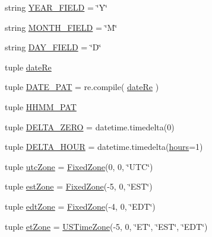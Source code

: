 \begin{DoxyCompactItemize}
string \hyperlink{namespaceamonpy_1_1sim_1_1sidereal__m_ae92c9b6866dbee32a46400d7f0572abb}{Y\-E\-A\-R\-\_\-\-F\-I\-E\-L\-D} = \char`\"{}Y\char`\"{}
\item 
string \hyperlink{namespaceamonpy_1_1sim_1_1sidereal__m_a873ef54e9b5478d5f40ca25fc4fc07be}{M\-O\-N\-T\-H\-\_\-\-F\-I\-E\-L\-D} = \char`\"{}M\char`\"{}
\item 
string \hyperlink{namespaceamonpy_1_1sim_1_1sidereal__m_a1d6c7b1ca1d962bdcc42fc6a03595717}{D\-A\-Y\-\_\-\-F\-I\-E\-L\-D} = \char`\"{}D\char`\"{}
\item 
tuple \hyperlink{namespaceamonpy_1_1sim_1_1sidereal__m_aed7de3b820e3551a51ebe17dd7770baa}{date\-Re}
\item 
tuple \hyperlink{namespaceamonpy_1_1sim_1_1sidereal__m_a1c0ec014abae8082035b7a0335ca4e5d}{D\-A\-T\-E\-\_\-\-P\-A\-T} = re.\-compile( \hyperlink{namespaceamonpy_1_1sim_1_1sidereal__m_aed7de3b820e3551a51ebe17dd7770baa}{date\-Re} )
\item 
tuple \hyperlink{namespaceamonpy_1_1sim_1_1sidereal__m_a0f6ab1a75753c104eefed365e14aad4a}{H\-H\-M\-M\-\_\-\-P\-A\-T}
\item 
tuple \hyperlink{namespaceamonpy_1_1sim_1_1sidereal__m_af468502357aec95173ae54130971484b}{D\-E\-L\-T\-A\-\_\-\-Z\-E\-R\-O} = datetime.\-timedelta(0)
\item 
tuple \hyperlink{namespaceamonpy_1_1sim_1_1sidereal__m_ae6efe7e6fac4c0f8c11b6fbf33a1bad9}{D\-E\-L\-T\-A\-\_\-\-H\-O\-U\-R} = datetime.\-timedelta(\hyperlink{namespaceamonpy_1_1sim_1_1sidereal__m_ab57a43b87f961c10d7510aba50c02942}{hours}=1)
\item 
tuple \hyperlink{namespaceamonpy_1_1sim_1_1sidereal__m_adc5dc1cfd4981bd421a8a994c76c65d4}{utc\-Zone} = \hyperlink{classamonpy_1_1sim_1_1sidereal__m_1_1_fixed_zone}{Fixed\-Zone}(0, 0, \char`\"{}U\-T\-C\char`\"{})
\item 
tuple \hyperlink{namespaceamonpy_1_1sim_1_1sidereal__m_ad4ecd1f85cd34046df5d51b69693c7d3}{est\-Zone} = \hyperlink{classamonpy_1_1sim_1_1sidereal__m_1_1_fixed_zone}{Fixed\-Zone}(-\/5, 0, \char`\"{}E\-S\-T\char`\"{})
\item 
tuple \hyperlink{namespaceamonpy_1_1sim_1_1sidereal__m_acab72e465649c98de2d76ea74d7f9b15}{edt\-Zone} = \hyperlink{classamonpy_1_1sim_1_1sidereal__m_1_1_fixed_zone}{Fixed\-Zone}(-\/4, 0, \char`\"{}E\-D\-T\char`\"{})
\item 
tuple \hyperlink{namespaceamonpy_1_1sim_1_1sidereal__m_a707d78fbaf9888c75c4e5db1ff8b49eb}{et\-Zone} = \hyperlink{classamonpy_1_1sim_1_1sidereal__m_1_1_u_s_time_zone}{U\-S\-Time\-Zone}(-\/5, 0, \char`\"{}E\-T\char`\"{}, \char`\"{}E\-S\-T\char`\"{}, \char`\"{}E\-D\-T\char`\"{})

\end{DoxyCompactItemize}
